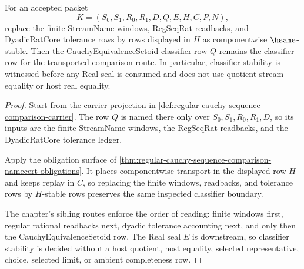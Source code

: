 \begin{theorem}
\label{thm:regular-cauchy-sequence-comparison-classifier-stability}
For an accepted packet
$$
K=(S_0,S_1,R_0,R_1,D,Q,E,H,C,P,N),
$$
replace the finite StreamName windows, RegSeqRat readbacks, and DyadicRatCore tolerance rows by rows displayed in $H$ as componentwise $\hsame$-stable. Then the CauchyEquivalenceSetoid classifier row $Q$ remains the classifier row for the transported comparison route. In particular, classifier stability is witnessed before any Real seal is consumed and does not use quotient stream equality or host real equality.
\end{theorem}
\begin{proof}
Start from the carrier projection in \autoref{def:regular-cauchy-sequence-comparison-carrier}. The row $Q$ is named there only over $S_0,S_1,R_0,R_1,D$, so its inputs are the finite StreamName windows, the RegSeqRat readbacks, and the DyadicRatCore tolerance ledger.

Apply the obligation surface of \autoref{thm:regular-cauchy-sequence-comparison-namecert-obligations}. It places componentwise transport in the displayed row $H$ and keeps replay in $C$, so replacing the finite windows, readbacks, and tolerance rows by $H$-stable rows preserves the same inspected classifier boundary.

The chapter's sibling routes enforce the order of reading: finite windows first, regular rational readbacks next, dyadic tolerance accounting next, and only then the CauchyEquivalenceSetoid row. The Real seal $E$ is downstream, so classifier stability is decided without a host quotient, host equality, selected representative, choice, selected limit, or ambient completeness row.
\end{proof}

